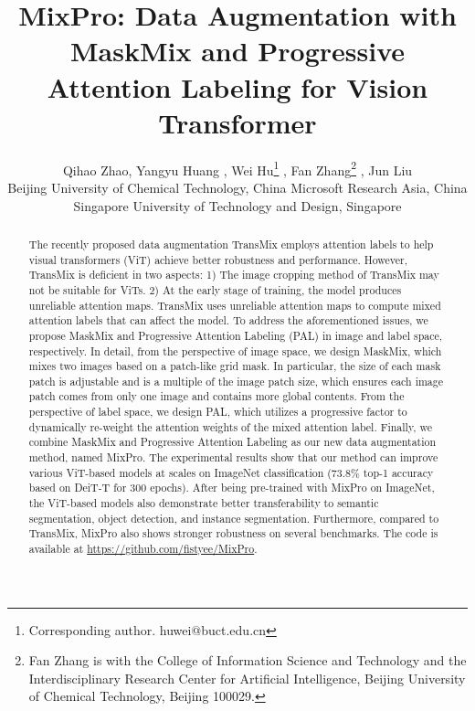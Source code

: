 \documentclass{article} \usepackage{iclr2023_conference,times}
\title{MixPro: Data Augmentation with MaskMix and Progressive Attention Labeling for Vision Transformer}
\author{Qihao Zhao, {Yangyu Huang} , Wei Hu\thanks{Corresponding author. huwei@buct.edu.cn}  , Fan Zhang\thanks{Fan Zhang is with the College of Information Science and Technology and the Interdisciplinary Research Center for Artificial Intelligence, Beijing University of Chemical Technology, Beijing 100029.} , Jun Liu\\
Beijing University of Chemical Technology, China
Microsoft Research Asia, China \\
Singapore University of Technology and Design, Singapore \\
\And
}
\begin{document}
\maketitle
\vspace{-20px}
\begin{abstract}
\label{secabs}

The recently proposed data augmentation TransMix employs attention labels to help visual transformers (ViT) achieve better robustness and performance. However, TransMix is deficient in two aspects: 1) The image cropping method of TransMix may not be suitable for ViTs. 2) At the early stage of training, the model produces unreliable attention maps. TransMix uses unreliable attention maps to compute mixed attention labels that can affect the model. To address the aforementioned issues, we propose MaskMix and Progressive Attention Labeling (PAL) in image and label space, respectively. In detail, from the perspective of image space, we design MaskMix, which mixes two images based on a patch-like grid mask. In particular, the size of each mask patch is adjustable and is a multiple of the image patch size, which ensures each image patch comes from only one image and contains more global contents. From the perspective of label space, we design PAL, which utilizes a progressive factor to dynamically re-weight the attention weights of the mixed attention label. Finally, we combine MaskMix and Progressive Attention Labeling as our new data augmentation method, named MixPro. The experimental results show that our method can improve various ViT-based models at scales on ImageNet classification (73.8\% top-1 accuracy based on DeiT-T for 300 epochs). After being pre-trained with MixPro on ImageNet, the ViT-based models also demonstrate better transferability to semantic segmentation, object detection, and instance segmentation. Furthermore, compared to TransMix, MixPro also shows stronger robustness on several benchmarks. The code is available at \url{https://github.com/fistyee/MixPro}. 
\end{abstract}

\vspace{-10px}
\end{document}
